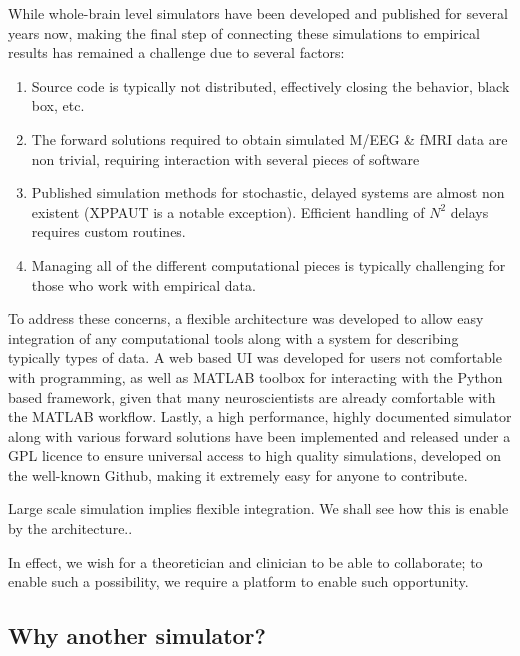 
While whole-brain level simulators have been developed and published for
several years now, making the final step of connecting these simulations to
empirical results has remained a challenge due to several factors:

\begin{enumerate}

	\item Source code is typically not distributed, effectively closing
	the behavior, black box, etc. 

	\item The forward solutions required to obtain simulated M/EEG \& fMRI
	data are non trivial, requiring interaction with several pieces of software

	\item Published simulation methods for stochastic, delayed systems 
		are almost non existent (XPPAUT \cite{XPPAUT} is a notable exception).
		Efficient handling of $N^2$ delays requires custom routines.

	\item Managing all of the different computational pieces is typically
	challenging for those who work with empirical data.

\end{enumerate}

To address these concerns, a flexible architecture was developed to
allow easy integration of any computational tools along with a system
for describing typically types of data. A web based UI was developed
for users not comfortable with programming, as well as MATLAB toolbox
for interacting with the Python based framework, given that many
neuroscientists are already comfortable with the MATLAB workflow.
Lastly, a high performance, highly documented simulator along with
various forward solutions have been implemented and released under a
GPL licence to ensure universal access to high quality simulations, 
developed on the well-known Github, making it extremely easy for 
anyone to contribute.


Large scale simulation implies flexible integration. We shall see
how this is enable by the architecture..

In effect, we wish for a theoretician and clinician to be able to
collaborate; to enable such a possibility, we require a platform
to enable such opportunity. 


\subsection{Why another simulator?}

